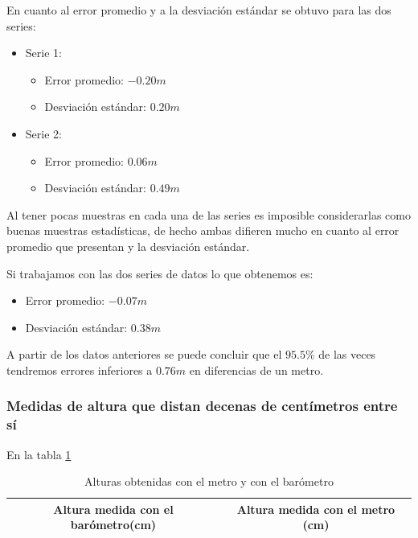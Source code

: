 \documentclass[spanish,12pt,a4paper,titlepage]{report}
\begin{document}
En cuanto al error promedio y a la desviación estándar se obtuvo para las dos series:

\begin{itemize}
\item Serie 1:
		\begin{itemize}
		\item Error promedio: $-0.20m$
		\item Desviación estándar: $0.20m$
		\end{itemize}
\item Serie 2:
		\begin{itemize}
		\item Error promedio: $0.06m$
		\item Desviación estándar: $0.49m$
		\end{itemize}
\end{itemize}

Al tener pocas muestras en cada una de las series es imposible considerarlas como buenas muestras estadísticas, de hecho ambas difieren mucho en cuanto al error promedio que presentan y la desviación estándar. 

Si trabajamos con las dos series de datos lo que obtenemos es:

\begin{itemize}
\item Error promedio: $-0.07m$
\item Desviación estándar: $0.38m$
\end{itemize}



A partir de los datos anteriores se puede concluir que el $95.5 \%$ de las veces tendremos errores inferiores a $0.76m$ en diferencias de un metro. 
\subsubsection*{Medidas de altura que distan decenas de centímetros entre sí}

En la tabla \ref{tab:alturascm}


\begin{table}[H]
\centering
\begin{tabular}{|c|c|} 

	\cellcolor[gray]{0.8} {Altura medida con el barómetro(cm)} &
	\cellcolor[gray]{0.8} Altura medida con el metro (cm) \\ \hline
\end{tabular}
\caption{Alturas obtenidas con el metro y con el barómetro}
\label{tab:alturascm}
\end{table}
\end{document}
